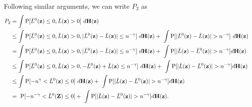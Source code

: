 \documentclass[twoside]{article}
\newcommand{\bZ}{\mathbf{Z}}
\newcommand{\bH}{\mathbf{H}}
\newcommand{\bz}{\mathbf{z}}
\newcommand{\0}{\mathbf{0}}
\newcommand{\1}{\mathbf{1}}
\numberwithin{equation}{section}
\begin{document}
\begin{enumerate}[(a)]
Following similar arguments, we can write $P_2$ as
\begin{align}\label{nrefP2}
    P_2 &= \int {\rm P}[\bar{L}^0(\bz)\leq 0,\bar{L}(\bz)> 0]\ d\bH(\bz)\nonumber\\
    &\leq \int {\rm P}[\bar{L}^0(\bz)\leq 0,\bar{L}(\bz)> 0, |\bar{L}^0(\bz)-\bar{L}(\bz)|\leq n^{-\gamma}]\ d\bH(\bz) +\ \int {\rm P}[|\bar{L}^0(\bz)-\bar{L}(\bz)|> n^{-\gamma}]\ d\bH(\bz)\nonumber\\
    &= \int {\rm P}[\bar{L}^0(\bz)\leq 0,\bar{L}(\bz)> 0, |\bar{L}^0(\bz)-\bar{L}(\bz)|\leq n^{-\gamma}]\ d\bH(\bz) +\ \int {\rm P}[|\bar{L}(\bz)-\bar{L}^0(\bz)|> n^{-\gamma}]d\bH(\bz)\nonumber\\
    &\leq \int {\rm P}[\bar{L}^0(\bz)\leq 0,\bar{L}(\bz)> 0, -\bar{L}^0(\bz)+\bar{L}(\bz)\leq n^{-\gamma}]\ d\bH(\bz) +\ \int {\rm P}[|\bar{L}(\bz)-\bar{L}^0(\bz)|> n^{-\gamma}]d\bH(\bz)\nonumber\\
    &\leq \int {\rm P}[-n^{\gamma}<\bar{L}^0(\bz)\leq 0]\ d\bH(\bz) +\ \int {\rm P}[|\bar{L}(\bz)-\bar{L}^0(\bz)|> n^{-\gamma}]d\bH(\bz)\nonumber\\
    &=\ {\rm P}[-n^{-\gamma}<\bar{L}^0(\bZ)\leq 0] + \ \int {\rm P}[|\bar{L}(\bz)-\bar{L}^0(\bz)|> n^{-\gamma}]d\bH(\bz).
\end{align}


\end{enumerate}
\end{document}
